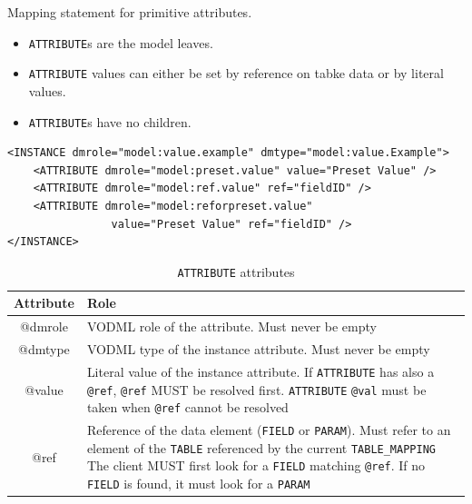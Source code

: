 \documentclass[11pt,a4paper]{ivoa}
\begin{document}
Mapping statement for primitive attributes.

\begin{itemize}
    \item \texttt{ATTRIBUTE}s  are the model leaves.     
    \item \texttt{ATTRIBUTE}  values can either be set by reference on tabke data or by literal values. 
    \item \texttt{ATTRIBUTE}s have no children.
\end{itemize}

\begin{lstlisting}[caption={ATTRIBUTE examples},style=XML]
<INSTANCE dmrole="model:value.example" dmtype="model:value.Example">
    <ATTRIBUTE dmrole="model:preset.value" value="Preset Value" />    
    <ATTRIBUTE dmrole="model:ref.value" ref="fieldID" />    
    <ATTRIBUTE dmrole="model:reforpreset.value" 
                value="Preset Value" ref="fieldID" />
</INSTANCE>
\end{lstlisting}


\begin{table}[!htbp]
\small
\centering
\begin{tabulary}{\linewidth}{|c|J|}
       \hline 
          \textbf{Attribute} & 
          \textbf{Role}\\
       \hline         \hline  
          @dmrole    & 
           VODML role of the attribute. 
           \newline  Must never be empty\\       
       \hline 
          @dmtype    & 
          VODML type of the instance attribute.
           \newline  Must never be empty\\
       \hline  
          @value   &
          Literal value of the instance attribute. 
                     \newline If  \texttt{ATTRIBUTE} has also a \texttt{@ref}, \texttt{@ref} MUST be resolved first.
                     \texttt{ATTRIBUTE}  \texttt{@val} must be taken when \texttt{@ref} cannot be resolved \\
        \hline
           @ref & 
            Reference of the data element (\texttt{FIELD} or \texttt{PARAM}).  
                    \newline Must refer to an element of the \texttt{TABLE}  referenced by the current     
                    \texttt{TABLE\_MAPPING}                    
                    \newline The client MUST first look for a \texttt{FIELD} matching \texttt{@ref}. 
                    \newline If no \texttt{FIELD}  is found, it must look for a \texttt{PARAM}
                    \\
       \hline 
     \end{tabulary}
     \caption{\texttt{ATTRIBUTE} attributes} 
     \label{tbl:att-att}
 \end{table}
\end{document}
